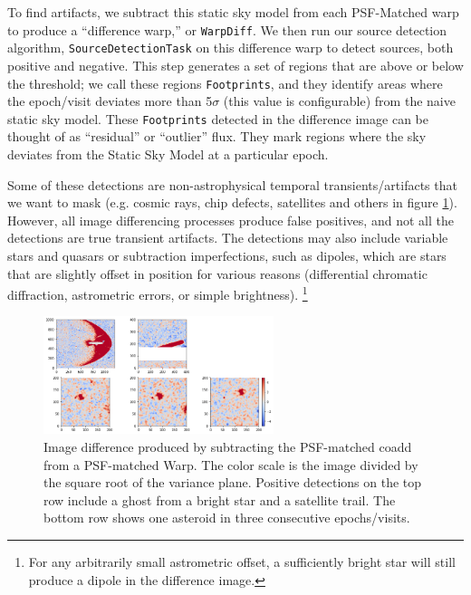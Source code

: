 \documentclass[DM,authoryear,toc]{lsstdoc}
\begin{document}
To find artifacts, we subtract this static sky model from each PSF-Matched warp to produce a ``difference warp,'' or \texttt{WarpDiff}.
We then run our source detection algorithm, \texttt{SourceDetectionTask} on this difference warp to detect sources, both positive and negative.
This step generates a set of regions that are above or below the threshold; we call these regions \texttt{Footprints}, and they identify areas where the epoch/visit deviates more than 5$\sigma$ (this value is configurable) from the naive static sky model.
These \texttt{Footprints} detected in the difference image can be thought of as ``residual'' or ``outlier'' flux.
They mark regions where the sky deviates from the Static Sky Model at a particular epoch.

Some of these detections are non-astrophysical temporal transients/artifacts that we want to mask (e.g. cosmic rays, chip defects, satellites and others in figure \ref{fig:artifacts}).
However, all image differencing processes produce false positives, and not all the detections are true transient artifacts.
The detections may also include variable stars and quasars or subtraction imperfections, such as dipoles, which are stars that are slightly offset in position for various reasons (differential chromatic diffraction, astrometric errors, or simple brightness).
\footnote{For any arbitrarily small astrometric offset, a sufficiently bright star will still produce a dipole in the difference image.}

\begin{figure}
\begin{centering}
\includegraphics[width=0.6\textwidth]{figures/artifacts.png}
\par\end{centering}
\caption{\label{fig:artifacts} Image difference produced by subtracting the PSF-matched coadd from a PSF-matched Warp. The color scale is the image divided by the square root of the variance plane. Positive detections on the top row include a ghost from a bright star and a satellite trail. The bottom row shows one asteroid in three consecutive epochs/visits.}
\end{figure}
\end{document}
